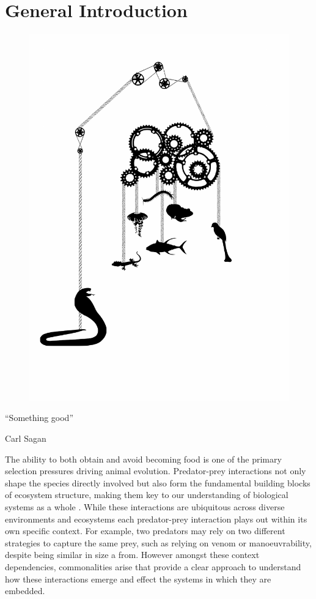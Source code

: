 \chapter{General Introduction}
\label{chap:introduction}%


\begin{figure}[h]
  \centering
  \includegraphics[width=.55\textwidth]{ch1-introduction/snake_complexity.pdf}
\end{figure}

\begin{quoteshrink}
  ``Something good''

\hfill{Carl Sagan}
\end{quoteshrink}


\noindent
The ability to both obtain and avoid becoming food is one of the primary selection pressures driving animal evolution. Predator-prey interactions not only shape the species directly involved but also form the fundamental building blocks of ecosystem structure, making them key to our understanding of biological systems as a whole \citep{pimm1984complexity,cohen1990community}. While these interactions are ubiquitous across diverse environments and ecosystems each predator-prey interaction plays out within its own specific context. For example, two predators may rely on two different strategies to capture the same prey, such as relying on venom or manoeuvrability, despite being similar in size a from. However amongst these context dependencies, commonalities arise that provide a clear approach to understand how these interactions emerge and effect the systems in which they are embedded.


